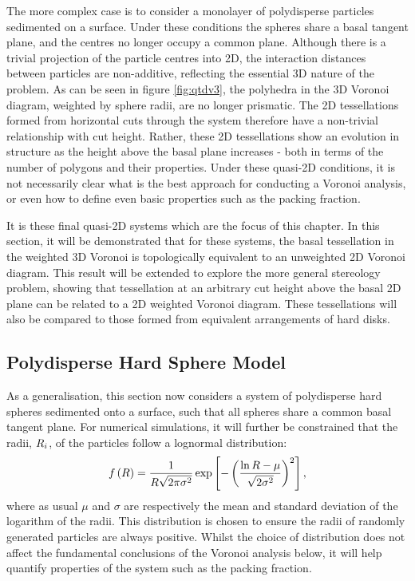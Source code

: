 The more complex case is to consider a monolayer of polydisperse particles sedimented on a surface.
Under these conditions the spheres share a basal tangent plane, and the centres no longer occupy a common plane.
Although there is a trivial projection of the particle centres into 2D, the interaction distances between particles are non\--additive, reflecting the essential 3D nature of the problem.
As can be seen in figure \ref{fig:qtdv3}, the polyhedra in the 3D Voronoi diagram, weighted by sphere radii, are no longer prismatic.
The 2D tessellations formed from horizontal cuts through the system therefore have a non\--trivial relationship with cut height.
Rather, these 2D tessellations show an evolution in structure as the height above the basal plane increases - both in terms of the number of polygons and their properties.
Under these quasi\--2D conditions, it is not necessarily clear what is the best approach for conducting a Voronoi analysis, or even how to define even basic properties such as the packing fraction.

It is these final quasi\--2D systems which are the focus of this chapter.
In this section, it will be demonstrated that for these systems, the basal tessellation in the weighted 3D Voronoi is topologically equivalent to an unweighted 2D Voronoi diagram.
This result will be extended to explore the more general stereology problem, showing that tessellation at an arbitrary cut height above the basal 2D plane can be related to a 2D weighted Voronoi diagram.
These tessellations will also be compared to those formed from equivalent arrangements of hard disks.


\subsection{Polydisperse Hard Sphere Model}

As a generalisation, this section now considers a system of polydisperse hard spheres sedimented onto a surface, such that all spheres share a common basal tangent plane.
For numerical simulations, it will further be constrained that the radii, $R_i$, of the particles follow a lognormal distribution:
\begin{equation}
	\label{eq:lognormal}
	f\left(R\right)=\frac{1}{R\sqrt{2\pi\sigma^2}}\exp{\left[-\left(\frac{\ln{R}-\mu}{\sqrt{2\sigma^2}}\right)^2\right]}\,,
\end{equation}
where as usual $\mu$ and $\sigma$ are respectively the mean and standard deviation of the logarithm of the radii.
This distribution is chosen to ensure the radii of randomly generated particles are always positive.
Whilst the choice of distribution does not affect the fundamental conclusions of the Voronoi analysis below, it will help quantify properties of the system such as the packing fraction.

